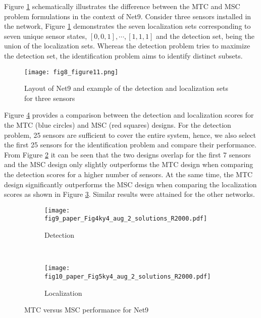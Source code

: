 \documentclass[twocolumn]{autart}
\begin{document}
Figure \ref{fig:net2} schematically illustrates the difference between the MTC and MSC problem formulations in the context of Net9. Consider three sensors installed in the network, Figure \ref{fig:net2} demonstrates the seven localization sets corresponding to seven unique sensor states, $[0,0,1],\cdots, [1,1,1]$ and the detection set, being the union of the localization sets. Whereas the detection problem tries to maximize the detection set, the identification problem aims to identify distinct subsets.

\begin{figure}
	\centering
		\texttt{[image: fig8\_figure11.png]}  
		\caption{\footnotesize Layout of Net9 and example of the detection and localization sets for three sensors}   		\label{fig:net2}
	\end{figure}\vspace{-0.15cm}

Figure \ref{fig:net2_2} provides a comparison between the detection and localization scores for the MTC (blue circles) and MSC (red squares) designs. 
For the detection problem, 25 sensors are sufficient to cover the entire system, hence, we also select the first 25 sensors for the identification problem and compare their performance. From Figure \ref{fig:net2_2a} it can be seen that the two designs overlap for the first 7 sensors and the MSC design only slightly outperforms the MTC design when comparing the detection scores for a higher number of sensors. At the same time, the MTC design significantly outperforms the MSC design when comparing the localization scores as shown in Figure \ref{fig:net2_2b}. Similar results were attained for the other networks.

\begin{figure}
        \centering
        \begin{subfigure}[b]{0.23\textwidth}
                \texttt{[image: fig9\_paper\_Fig4ky4\_aug\_2\_solutions\_R2000.pdf]}
		\caption{Detection}
                \label{fig:net2_2a}
        \end{subfigure}~ \begin{subfigure}[b]{0.23\textwidth}
                \texttt{[image: fig10\_paper\_Fig5ky4\_aug\_2\_solutions\_R2000.pdf]}
		\caption{Localization}
                \label{fig:net2_2b}
        \end{subfigure}
       \caption{MTC versus MSC performance for Net9}  \label{fig:net2_2}
\end{figure}
\end{document}
